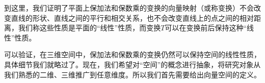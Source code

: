 到这里，我们证明了平面上保加法和保数乘的变换的向量映射（或称变换）不会改变直线的形状、直线之间的平行和相交关系，也不会改变直线上的点之间的相对距离，我们称这些性质是平面的“线性”性质，而变换$T$可以在变换前后保持这种“线性”性质。

可以验证，在三维空间中，保加法和保数乘的变换仍然可以保持空间的线性性质，具体细节我们就略过了。现在，我们希望对“空间”的概念进行抽象，将研究对象从我们熟悉的二维、三维推广到任意维度。所以我们首先需要给出向量空间的定义。





